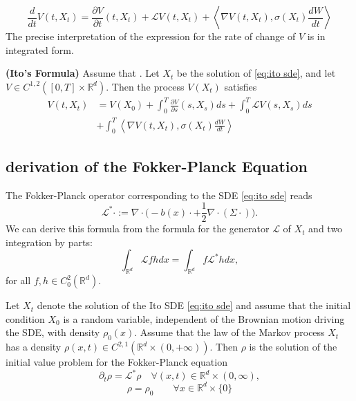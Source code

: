 \documentclass{article}
\begin{document}
\begin{equation}
    \frac{d}{dt}V(t,X_t) = \frac{\partial V}{\partial t}(t,X_t)+\mathcal{L} V(t,X_t)+ \left< \nabla V(t,X_t), \sigma (X_t) \frac{dW}{dt} \right>  
\end{equation}
The precise interpretation of the expression for the rate of change of $V$ is in integrated form.
\begin{theorem}\textbf{(Ito's Formula)}
    Assume that . Let $X_t$ be the solution of \eqref{eq:ito sde}, and let $V \in C^{1,2}([0,T]\times \mathbb{R}^d)$. Then the process $V(X_t)$ satisfies
    \begin{align*}
        V(t,X_t) &=V(X_0)+\int_0^T\frac{\partial V}{\partial s}(s,X_s)ds +\int_0^T \mathcal{L} V(s,X_s)ds\\
        &+\int_0^T \left< \nabla V(t,X_t), \sigma (X_t) \frac{dW}{dt} \right>  
    \end{align*}
\end{theorem}

\subsection*{derivation of the Fokker-Planck Equation}
The Fokker-Planck operator corresponding to the SDE \eqref{eq:ito sde} reads
\begin{equation}
    \mathcal{L}^*\cdot := \nabla \cdot \big(-b(x) \cdot+\frac{1}{2}\nabla\cdot (\Sigma \cdot) \big).
\end{equation}
We can derive this formula from the formula for the generator $\mathcal{L}$ of $X_t$ and two integration by parts:
$$\int_{\mathbb{R}^d} \mathcal{L}fh dx = \int_{\mathbb{R}^d}f \mathcal{L}^*h dx,$$
for all $f,h \in C_0^2(\mathbb{R}^d).$
\begin{proposition}
    Let $X_t$ denote the solution of the Ito SDE \eqref{eq:ito sde} and assume that the initial condition $X_0$ is a random variable, independent of the Brownian motion driving the SDE, with density $\rho_0(x)$. Assume that the law of the Markov process $X_t$ has a density $\rho(x,t) \in C^{2,1}(\mathbb{R}^d\times (0,+\infty)).$ Then $\rho$ is the solution of the initial value problem for the Fokker-Planck equation
    \begin{equation}
        \partial_t \rho = \mathcal{L}^* \rho \quad \forall (x,t) \in \mathbb{R}^d \times(0,\infty),
    \end{equation}
    \begin{equation}
        \rho = \rho_0 \qquad \forall x\in \mathbb{R}^d\times\{0\}
    \end{equation}
\end{proposition}
\end{document}
